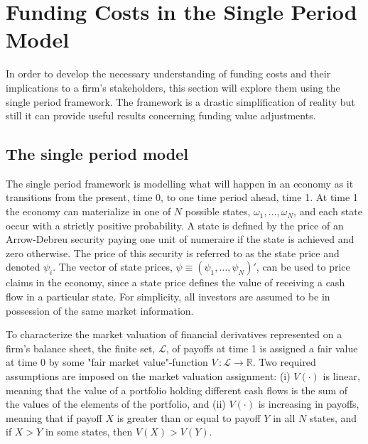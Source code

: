 \documentclass[../main.tex]{subfiles}
\begin{document}
    \section{Funding Costs in the Single Period Model}
        In order to develop the necessary understanding of funding costs and their implications to a firm's stakeholders, this section will explore them using the single period framework.
        The framework is a drastic simplification of reality but still it can provide useful results concerning funding value adjustments.

    \subsection{The single period model}
        The single period framework is modelling what will happen in an economy as it transitions from the present, time 0, to one time period ahead, time 1.
        At time 1 the economy can materialize in one of $N$ possible states, $\omega_{1}, \dots, \omega_{N}$, and each state occur with a strictly positive probability.
        A state is defined by the price of an Arrow-Debreu security paying one unit of numeraire if the state is achieved and zero otherwise.
        The price of this security is referred to as the state price and denoted $\psi_{i}$.
        The vector of state prices, $\psi \equiv \left(\psi_{1}, \dots, \psi_{N}\right)'$, can be used to price claims in the economy, since a state price defines the value of receiving a cash flow in a particular state.
        For simplicity, all investors are assumed to be in possession of the same market information.

        To characterize the market valuation of financial derivatives represented on a firm's balance sheet, the finite set, $\mathcal{L}$, of payoffs at time 1 is assigned a fair value at time 0 by some "fair market value"-function $V\, \colon \mathcal{L} \rightarrow \mathbb{R}$.
        Two required assumptions are imposed on the market valuation assignment: 
        (i) $V(\cdot)$ is linear, meaning that the value of a portfolio holding different cash flows is the sum of the values of the elements of the portfolio, and 
        (ii) $V(\cdot)$ is increasing in payoffs, meaning that if payoff $X$ is greater than or equal to payoff $Y$ in all $N$ states, and if $X>Y$ in some states, then $V(X)>V(Y)$.
        
\end{document}
